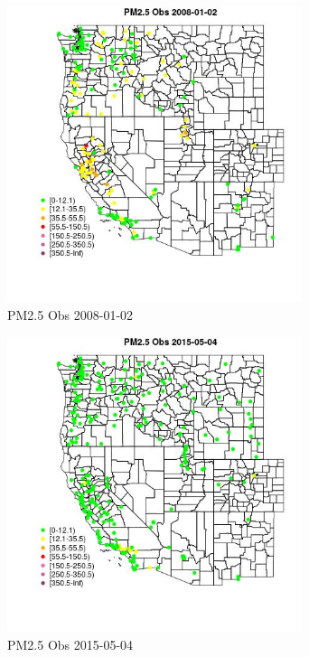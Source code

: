 \begin{figure} 
\centering  
\includegraphics[width=0.77\textwidth]{Code_Outputs/Report_ML_input_PM25_Step4_part_e_de_duplicated_aves_compiled_2019-05-18wNAs_MapObsPM25_Obs2008-01-02.jpg} 
\caption{\label{fig:Report_ML_input_PM25_Step4_part_e_de_duplicated_aves_compiled_2019-05-18wNAsMapObsPM25_Obs2008-01-02}PM2.5 Obs 2008-01-02} 
\end{figure} 
 

\clearpage 

\begin{figure} 
\centering  
\includegraphics[width=0.77\textwidth]{Code_Outputs/Report_ML_input_PM25_Step4_part_e_de_duplicated_aves_compiled_2019-05-18wNAs_MapObsPM25_Obs2015-05-04.jpg} 
\caption{\label{fig:Report_ML_input_PM25_Step4_part_e_de_duplicated_aves_compiled_2019-05-18wNAsMapObsPM25_Obs2015-05-04}PM2.5 Obs 2015-05-04} 
\end{figure} 
 


